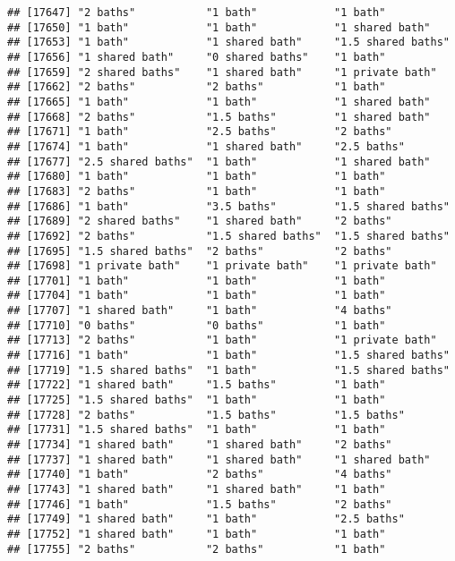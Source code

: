 \documentclass[
]{article}
\begin{document}
\begin{verbatim}
## [17647] "2 baths"           "1 bath"            "1 bath"           
## [17650] "1 bath"            "1 bath"            "1 shared bath"    
## [17653] "1 bath"            "1 shared bath"     "1.5 shared baths" 
## [17656] "1 shared bath"     "0 shared baths"    "1 bath"           
## [17659] "2 shared baths"    "1 shared bath"     "1 private bath"   
## [17662] "2 baths"           "2 baths"           "1 bath"           
## [17665] "1 bath"            "1 bath"            "1 shared bath"    
## [17668] "2 baths"           "1.5 baths"         "1 shared bath"    
## [17671] "1 bath"            "2.5 baths"         "2 baths"          
## [17674] "1 bath"            "1 shared bath"     "2.5 baths"        
## [17677] "2.5 shared baths"  "1 bath"            "1 shared bath"    
## [17680] "1 bath"            "1 bath"            "1 bath"           
## [17683] "2 baths"           "1 bath"            "1 bath"           
## [17686] "1 bath"            "3.5 baths"         "1.5 shared baths" 
## [17689] "2 shared baths"    "1 shared bath"     "2 baths"          
## [17692] "2 baths"           "1.5 shared baths"  "1.5 shared baths" 
## [17695] "1.5 shared baths"  "2 baths"           "2 baths"          
## [17698] "1 private bath"    "1 private bath"    "1 private bath"   
## [17701] "1 bath"            "1 bath"            "1 bath"           
## [17704] "1 bath"            "1 bath"            "1 bath"           
## [17707] "1 shared bath"     "1 bath"            "4 baths"          
## [17710] "0 baths"           "0 baths"           "1 bath"           
## [17713] "2 baths"           "1 bath"            "1 private bath"   
## [17716] "1 bath"            "1 bath"            "1.5 shared baths" 
## [17719] "1.5 shared baths"  "1 bath"            "1.5 shared baths" 
## [17722] "1 shared bath"     "1.5 baths"         "1 bath"           
## [17725] "1.5 shared baths"  "1 bath"            "1 bath"           
## [17728] "2 baths"           "1.5 baths"         "1.5 baths"        
## [17731] "1.5 shared baths"  "1 bath"            "1 bath"           
## [17734] "1 shared bath"     "1 shared bath"     "2 baths"          
## [17737] "1 shared bath"     "1 shared bath"     "1 shared bath"    
## [17740] "1 bath"            "2 baths"           "4 baths"          
## [17743] "1 shared bath"     "1 shared bath"     "1 bath"           
## [17746] "1 bath"            "1.5 baths"         "2 baths"          
## [17749] "1 shared bath"     "1 bath"            "2.5 baths"        
## [17752] "1 shared bath"     "1 bath"            "1 bath"           
## [17755] "2 baths"           "2 baths"           "1 bath"           

\end{verbatim}
\end{document}
